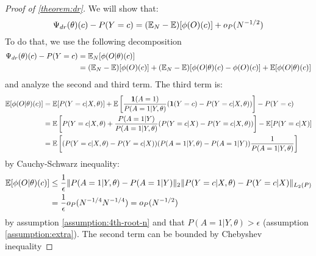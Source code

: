 \begin{proof}[Proof of \cref{theorem:dr}]
We will show that:
\begin{equation}
\Psi_{dr}(\theta)(c) - P(Y=c) = (\mathbb{E}_N - \mathbb{E})[\phi(O)(c)] + o_P(N^{-1/2})
\label{eq:proof-linearity}
\end{equation}
To do that, we use the following decomposition
\begin{equation}
\begin{aligned}
\Psi_{dr}(\theta)(c) - P(Y=c) &= \mathbb{E}_N [\phi(O|\theta)(c)] \\
&= (\mathbb{E}_N - \mathbb{E})[\phi(O)(c)] + (\mathbb{E}_N - \mathbb{E})[\phi(O|\theta)(c) - \phi(O)(c)] + \mathbb{E}[\phi(O|\theta)(c)]
\end{aligned}
\end{equation}
and analyze the second and third term. The third term is:
\begin{equation}
\begin{aligned}
\mathbb{E}[\phi(O|\theta)(c)] &= \mathbb{E}[P(Y=c|X,\theta)] + \mathbb{E}\left[\frac{\textbf{1}(A=1)}{P(A=1|Y,\theta)}(\textbf{1}(Y=c) - P(Y=c|X,\theta))\right]- P(Y=c) \\
&= \mathbb{E}\left[P(Y=c|X,\theta) + \frac{P(A=1|Y)}{P(A=1|Y,\theta)}(P(Y=c|X) - P(Y=c|X,\theta))\right] - \mathbb{E}[P(Y=c|X)]\\
&= \mathbb{E}\left[(P(Y=c|X,\theta) - P(Y=c|X)) (P(A=1|Y,\theta) -P(A=1|Y)) \frac{1}{P(A=1|Y,\theta)}\right]\\
\end{aligned}
\end{equation}
by Cauchy-Schwarz inequality:
\begin{equation}
\begin{aligned}
\mathbb{E}[\phi(O|\theta)(c)] &\le \frac{1}{\epsilon} \|P(A=1|Y,\theta) - P(A=1|Y)\|_2 \|P(Y=c|X,\theta) - P(Y=c|X)\|_{L_2(P)}\\
&= \frac{1}{\epsilon} o_P(N^{-1/4} N^{-1/4}) = o_P(N^{-1/2})
\end{aligned}
\end{equation}
by assumption \ref{assumption:4th-root-n} and that $P(A=1|Y,\theta) > \epsilon$ (assumption \ref{assumption:extra}). The second term can be bounded by Chebyshev inequality

\end{proof}

